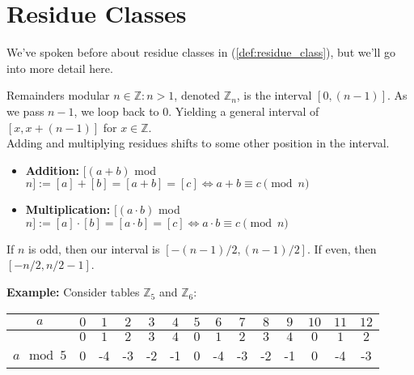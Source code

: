 \section{Residue Classes}
We've spoken before about residue classes in (\ref{def:residue_class}), 
but we'll go into more detail here.

\begin{theo}
   
    Remainders modular $n\in\mathbb{Z}:n>1$, denoted $\mathbb{Z}_n$, is the interval $[0,(n-1)]$.
    As we pass $n-1$, we loop back to $0$. Yielding a general interval of $[x,x+(n-1)]$ for $x\in\mathbb{Z}$.\\

    \noindent
    Adding and multiplying residues shifts to some other position in the interval.
    \begin{itemize}
        \item \textbf{Addition:} $[(a+b)$ mod $n]:=[a] + [b] = [a+b] = [c]\Longleftrightarrow a+b\equiv c\pmod{n}$
        \item \textbf{Multiplication:} $[(a\cdot b)$ mod $n]:=[a]\cdot[b] = [a\cdot b]=[c]\Longleftrightarrow a\cdot b\equiv c \pmod{n}$
    \end{itemize}

    \noindent
    If $n$ is odd, then our interval is $[-(n-1)/2,(n-1)/2]$. If even, then $[-n/2,n/2-1]$.
\end{theo}
\newpage
\noindent
\textbf{Example:} Consider tables $\mathbb{Z}_5$ and $\mathbb{Z}_6$:
\begin{table}[h!]
    \setlength{\tabcolsep}{10pt} %
    \renewcommand{\arraystretch}{1.2} %
    \centering
\begin{tabular}{|*{14}{c|}}
    
    
    \hline
   \cellcolor{white}$a$ & $0$ & $1$ & $2$ & \cellcolor{OliveGreen!40}$3$ &\cellcolor{OliveGreen!40} $4$ &\cellcolor{OliveGreen!40} $5$ &\cellcolor{OliveGreen!40} $6$ &\cellcolor{OliveGreen!40} $7$ & $8$ & $9$ & $10$ & $11$ & $12$ \\
    \hline
       & $0$ & $1$ & $2$ & $3$ & $4$ & \cellcolor{OliveGreen!20}$0$ &\cellcolor{OliveGreen!20} $1$ &\cellcolor{OliveGreen!20} $2$ & $3$ & $4$ & $0$ & $1$ & $2$ \\
    \cline{2-14}
    \multirow{-2}{*}{$a\mod 5$}&0&-4&-3&\cellcolor{OliveGreen!20}-2&\cellcolor{OliveGreen!20}-1&\cellcolor{OliveGreen!20}0&-4&-3&-2&-1&0&-4&-3\\
    \hline
\end{tabular}
\end{table}

